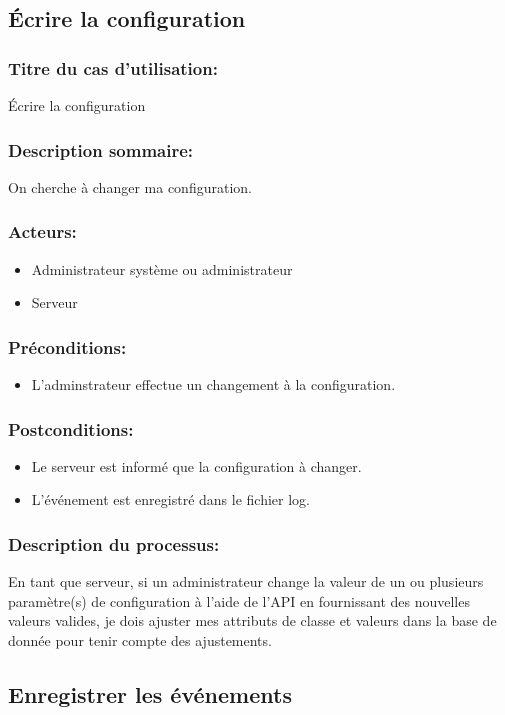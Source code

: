 \documentclass{scrreprt}
\begin{document}
\subsection{Écrire la configuration}
\subsubsection{Titre du cas d'utilisation:} Écrire la configuration
\subsubsection{Description sommaire:} On cherche à changer ma configuration.
\subsubsection{Acteurs:} 
\begin{itemize}
    \item Administrateur système ou administrateur
    \item Serveur
\end{itemize}
\subsubsection{Préconditions:}
\begin{itemize}
    \item L'adminstrateur effectue un changement à la configuration.
\end{itemize} 
\subsubsection{Postconditions:}
\begin{itemize}
    \item  Le serveur est informé que la configuration à changer.
    \item  L'événement est enregistré dans le fichier log.
\end{itemize} 
\subsubsection{Description du processus:}En tant que serveur, si un administrateur change la valeur de un ou plusieurs paramètre(s)
de configuration à l'aide de l'API en fournissant des nouvelles valeurs valides,
je dois ajuster mes attributs de classe et valeurs dans la base de donnée
pour tenir compte des ajustements.

\subsection{Enregistrer les événements}
\end{document}
